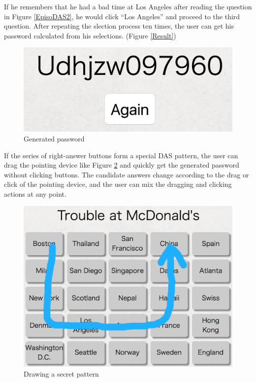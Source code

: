 \documentclass[sigconf]{acmart}
\begin{document}
If he remembers that he had a bad time at Los Angeles
after reading the question in Figure \ref{EpisoDAS2},
he would click ``Los Angeles'' and proceed to the third question.
%
After repeating the slection process ten times,
the user can get his password
calculated from his selections. (Figure \ref{Result})

\begin{figure}[H]
  \includegraphics[width=12cm,bb=0 0 1160 468]{figures/result.png}
  \caption{Generated password}
  \label{result}
\end{figure}

If the series of right-answer buttons form a special DAS pattern,
the user can drag the pointing device like
Figure \ref{draw} and quickly get the generated
password without clicking buttons.
%
The candidate answers change according to the drag or click of the
pointing device, and the user can mix the dragging and clicking actions
at any point.

\begin{figure}[H]
  \includegraphics[width=12cm,bb=0 0 1130 1236]{figures/draw.png}
  \caption{Drawing a secret pattern}
  \label{draw}
\end{figure}
\end{document}
